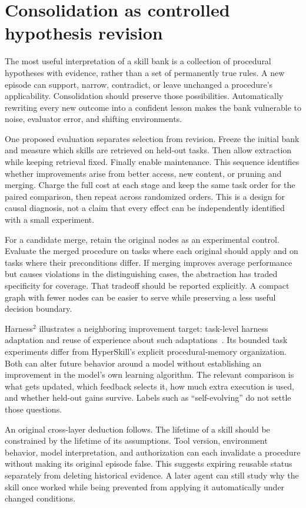 \section{Consolidation as controlled hypothesis revision}\label{sec:C15:synthesis}
The most useful interpretation of a skill bank is a collection of procedural hypotheses with evidence, rather than a set of permanently true rules. A new episode can support, narrow, contradict, or leave unchanged a procedure's applicability. Consolidation should preserve those possibilities. Automatically rewriting every new outcome into a confident lesson makes the bank vulnerable to noise, evaluator error, and shifting environments.

One proposed evaluation separates selection from revision. Freeze the initial bank and measure which skills are retrieved on held-out tasks. Then allow extraction while keeping retrieval fixed. Finally enable maintenance. This sequence identifies whether improvements arise from better access, new content, or pruning and merging. Charge the full cost at each stage and keep the same task order for the paired comparison, then repeat across randomized orders. This is a design for causal diagnosis, not a claim that every effect can be independently identified with a small experiment.

For a candidate merge, retain the original nodes as an experimental control. Evaluate the merged procedure on tasks where each original should apply and on tasks where their preconditions differ. If merging improves average performance but causes violations in the distinguishing cases, the abstraction has traded specificity for coverage. That tradeoff should be reported explicitly. A compact graph with fewer nodes can be easier to serve while preserving a less useful decision boundary.

Harness$^2$ illustrates a neighboring improvement target: task-level harness adaptation and reuse of experience about such adaptations~\cite{corpus261014224}. Its bounded task experiments differ from HyperSkill's explicit procedural-memory organization. Both can alter future behavior around a model without establishing an improvement in the model's own learning algorithm. The relevant comparison is what gets updated, which feedback selects it, how much extra execution is used, and whether held-out gains survive. Labels such as ``self-evolving'' do not settle those questions.

An original cross-layer deduction follows. The lifetime of a skill should be constrained by the lifetime of its assumptions. Tool version, environment behavior, model interpretation, and authorization can each invalidate a procedure without making its original episode false. This suggests expiring reusable status separately from deleting historical evidence. A later agent can still study why the skill once worked while being prevented from applying it automatically under changed conditions.

